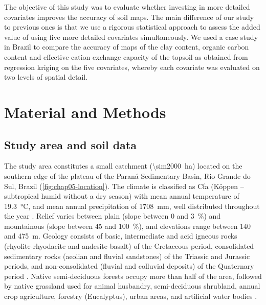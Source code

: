The objective of this study was to evaluate whether investing in more detailed covariates improves the accuracy 
of soil maps. The main difference of our study to previous ones is that we use a rigorous statistical approach 
to assess the added value of using five more detailed covariates simultaneously. We used a case study in Brazil 
to compare the accuracy of maps of the clay content, organic carbon content and effective cation exchange 
capacity of the topsoil as obtained from regression kriging on the five covariates, whereby each covariate was 
evaluated on two levels of spatial detail.

\section{Material and Methods}
\label{sec:chap05-methods}

\subsection{Study area and soil data}
\label{subsec:chap05-soil-data}

The study area constitutes a small catchment (\SI{\sim2000}{\hectare}) located on the southern edge of the 
plateau of the Paraná Sedimentary Basin, Rio Grande do Sul, Brazil (\autoref{fig:chap05-location}). The climate 
is classified as Cfa (K\"oppen -- subtropical humid without a dry season) with mean annual temperature of 
\SI{19.3}{\celsius}, and mean annual precipitation of \SI{1708}{\mm}, well distributed throughout the year 
\cite{Maluf2000}. Relief varies between plain (slope between \num{0} and \SI{3}{\percent}) and mountainous 
(slope between \num{45} and \SI{100}{\percent}), and elevations range between \num{140} and \SI{475}{\m}. 
Geology consists of basic, intermediate and acid igneous rocks (rhyolite-rhyodacite and andesite-basalt) of the 
Cretaceous period, consolidated sedimentary rocks (aeolian and fluvial sandstones) of the Triassic and Jurassic 
periods, and non-consolidated (fluvial and colluvial deposits) of the Quaternary period 
\cite{GasparettoEtAl1988, MacielFilho1990, Sartori2009}. Native semi-deciduous forests occupy more than 
half of the area, followed by native grassland used for animal husbandry, semi-deciduous shrubland, annual 
crop agriculture, forestry (Eucalyptus), urban areas, and artificial water bodies \cite{SamuelRosaEtAl2011a}.

